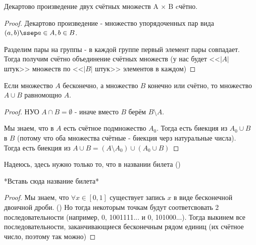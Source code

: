 \begin{theorem} \thmslashn

	Декартово произведение двух счётных множеств A × B cчётно.
	\begin{proof} \thmslashn
	
		Декартово произведение - множество упорядоченных пар вида $(a, b) \ssep a \in A, b \in B$.
		
		Разделим пары на группы - в каждой группе первый элемент пары совпадает. Тогда получим счётно объединение счётных множеств (у нас будет <<$|A|$ штук>> множеств по <<$|B|$ штук>> элементов в каждом)
	\end{proof}
\end{theorem}


\begin{theorem} \thmslashn

	Если множество $A$ бесконечно, а множество $B$ конечно или счётно, то множество $A \cup B$ равномощно $A$.
	\begin{proof} \thmslashn
	
		НУО $A \cap B = \emptyset $ - иначе вместо $B$ берём $B \setminus A$.
		
		Мы знаем, что в $A$ есть счётное подмножество $A_0$. Тогда есть биекция из $A_0 \cup B$ в $B$ (потому что оба множества счётные - биекция черз натуральные числа). Тогда есть биекция из $A \cup B = (A \setminus A_0) \cup (A_0 \cup B)$
	\end{proof}
\end{theorem}

Надеюсь, здесь нужно только то, что в названии билета ()
\begin{theorem} \thmslashn

	*Вставь сюда название билета*
	\begin{proof} \thmslashn
	
		Мы знаем, что $\forall x \in [0,1]$ существует запись $x$ в виде бесконечной двоичной дроби. () Но тогда некоторым точкам будут соответсвовать 2 последовательности (например, 0, 1001111... и 0, 101000...). Тогда выкинем все последовательности, заканчивающиеся бесконечным рядом единиц (их счётное число, поэтому так можно)
	\end{proof}
\end{theorem}

